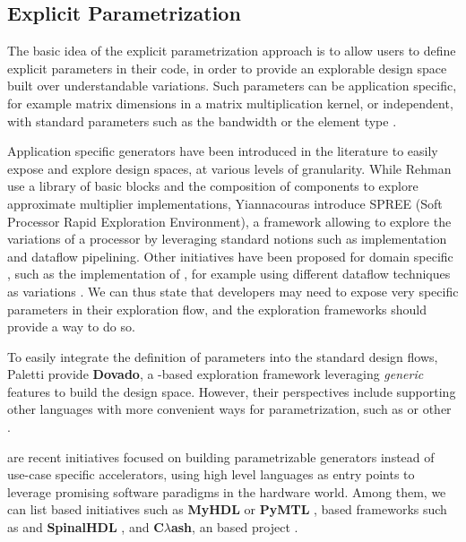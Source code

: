     \subsection{Explicit Parametrization}
    \label{ch.state:sec.space:ssec.explicit}
        
        The basic idea of the explicit parametrization approach is to allow users to define explicit parameters in their code, in order to provide an explorable design space built over understandable variations.
        Such parameters can be application specific, for example matrix dimensions in a matrix multiplication kernel, or independent, with standard parameters such as the  bandwidth or the element type \cite{ferres_2021_integrating}.

        Application specific generators have been introduced in the literature to easily expose and explore design spaces, at various levels of granularity.
        While Rehman \etal{} \cite{rehman_architectural-space_2016} use a library of basic blocks and the composition of components to explore approximate multiplier implementations, Yiannacouras \etal{} \cite{yiannacouras_exploration_2007} introduce SPREE (Soft Processor Rapid Exploration Environment), a framework allowing to explore the variations of a processor by leveraging standard  notions such as  implementation and dataflow pipelining.
        Other initiatives have been proposed for domain specific , such as the implementation of , for example using different dataflow techniques as variations \cite{park_roofline-model-based_2020}.
        We can thus state that developers may need to expose very specific parameters in their exploration flow, and the exploration frameworks should provide a way to do so.

        To easily integrate the definition of parameters into the standard design flows, Paletti \etal{} \cite{paletti_dovado_2021} provide {\bf Dovado}, a -based exploration framework leveraging  {\it generic} features to build the design space.
        However, their perspectives include supporting other languages with more convenient ways for parametrization, such as \chisel{} or other .

         are recent initiatives focused on building parametrizable generators instead of use-case specific accelerators, using high level languages as entry points to leverage promising software paradigms in the hardware world.
        Among them, we can list \python{} based initiatives such as {\bf MyHDL} \cite{jaic2015enhancing} or {\bf PyMTL} \cite{lockhart_pymtl_2014}, \scala{} based frameworks such as \chisel{} \cite{bachrach_chisel_2012} and {\bf SpinalHDL} \cite{papon2017spinalhdl}, and {\bf C$\lambda$ash}, an \haskell{} based project \cite{baaij_clash_2010}.

